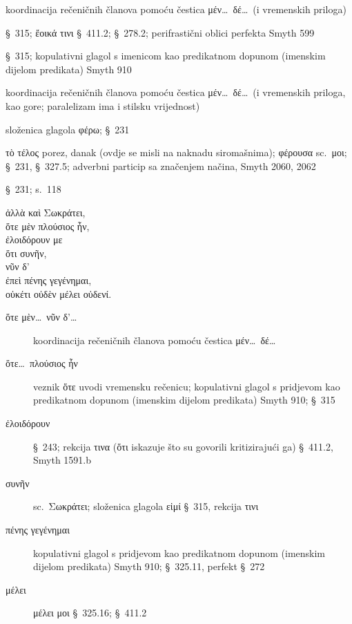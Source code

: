 \begin{description}[noitemsep]
\item[νῦν μέν\dots\ τότε δὲ\dots] koordinacija rečeničnih članova pomoću čestica μέν\dots\ δέ\dots\ (i vremenskih priloga)
\item[εἰμί\dots\ ἐοικώς] §~315; ἔοικά τινι §~411.2; §~278.2; perifrastični oblici perfekta Smyth 599
\item[δοῦλος ἦν] §~315; kopulativni glagol s imenicom kao predikatnom dopunom (imenskim dijelom predikata) Smyth 910
\item[τότε μέν ... νῦν δὲ] koordinacija rečeničnih članova pomoću čestica μέν\dots\ δέ\dots\ (i vremenskih priloga, kao gore; paralelizam ima i stilsku vrijednost)
\item[ἀπέφερον] složenica glagola φέρω; §~231
\item[τέλος φέρουσα] τὸ τέλος porez, danak (ovdje se misli na naknadu siromašnima); φέρουσα sc.\ μοι; §~231, §~327.5; adverbni particip sa značenjem načina, Smyth 2060, 2062
\item[τρέφει] §~231; s.~118
\end{description}

{\large
\begin{greek}
\noindent ἀλλὰ καὶ Σωκράτει, \\
\tabto{2em} ὅτε μὲν πλούσιος ἦν, \\
ἐλοιδόρουν με \\
\tabto{2em} ὅτι συνῆν, \\
νῦν δ' \\
\tabto{2em} ἐπεὶ πένης γεγένημαι, \\
οὐκέτι οὐδὲν μέλει οὐδενί. \\

\end{greek}
}

\begin{description}
\item[ὅτε μὲν\dots\ νῦν δ'\dots] koordinacija rečeničnih članova pomoću čestica μέν\dots\ δέ\dots
\item[ὅτε\dots\ πλούσιος ἦν] veznik ὅτε uvodi vremensku rečenicu; kopulativni glagol s pridjevom kao predikatnom dopunom (imenskim dijelom predikata) Smyth 910; §~315 
\item[ἐλοιδόρουν] §~243; rekcija τινα (ὅτι iskazuje što su govorili kritizirajući ga) §~411.2, Smyth 1591.b
\item[συνῆν] sc.\ Σωκράτει; složenica glagola εἰμί §~315, rekcija τινι
\item[πένης γεγένημαι] kopulativni glagol s pridjevom kao predikatnom dopunom (imenskim dijelom predikata) Smyth 910; §~325.11, perfekt §~272
\item[μέλει] μέλει μοι §~325.16; §~411.2 

\end{description}

